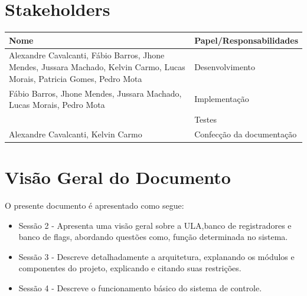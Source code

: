 \documentclass{report}
\begin{document}
  \section{Stakeholders}
    \FloatBarrier
    \begin{table}[H] 
      \begin{center}
        \begin{tabular}[pos]{|m{6cm} | m{8cm}|} 
          \hline 
          \cellcolor[gray]{0.9}\textbf{Nome} & \cellcolor[gray]{0.9}\textbf{Papel/Responsabilidades} \\ \hline
          Alexandre Cavalcanti, Fábio Barros, Jhone Mendes, Jussara Machado, Kelvin Carmo, Lucas Morais, Patricia Gomes, Pedro Mota & Desenvolvimento\\ \hline
          Fábio Barros, Jhone Mendes, Jussara Machado, Lucas Morais, Pedro Mota & Implementação\\ \hline
          & Testes\\ \hline
          Alexandre Cavalcanti, Kelvin Carmo & Confecção da documentação\\ \hline
        \end{tabular}
      \end{center}
    \end{table} 

\section{Visão Geral do Documento}

O presente documento é apresentado como segue:

\begin{itemize}
  
  \item Sessão 2 - Apresenta uma visão geral sobre a ULA,banco de registradores e banco de flags, abordando questões como, função determinada no sistema.
  \item Sessão 3 - Descreve detalhadamente a arquitetura, explanando os módulos e componentes do projeto, explicando e citando suas restrições.
  \item Sessão 4 - Descreve o funcionamento básico do sistema de controle.

\end{itemize}

\end{document}

